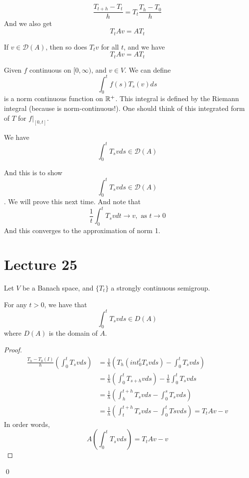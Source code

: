 \begin{equation*}
    \frac{T_{t+h}-T_t}{h}=T_t\frac{T_h-T_0}{h}
\end{equation*}
And we also get
\begin{equation*}
    T_tAv=AT_t
\end{equation*}
\begin{proposition}
    If $v\in\mathcal{D}(A)$, then so does $T_tv$ for all $t$, and we have
    \begin{equation*}
        T_tAv=AT_t
    \end{equation*}
\end{proposition}
Given $f$ continuous on $[0,\infty)$, and $v\in V$. We can define 
\begin{equation*}
    \int_0^tf(s)T_s(v)ds 
\end{equation*}
is a norm continuous function on $\mathbb{R}^+$. This integral is defined by the Riemann integral (because is norm-continuous!).
One should think of this integrated form of $T$ for $f\vert_{[0,t]}$.
\begin{proposition}
    We have
    \begin{equation*}
        \int_0^tT_svds\in\mathcal{D}(A)
    \end{equation*}
\end{proposition}
And this is to show 
\begin{equation*}
    \int_0^tT_svds\in\mathcal{D}(A)
\end{equation*}. We will prove this next time. And note that
\begin{equation*}
    \frac{1}{t}\int_0^tT_svdt\to v, \text{ as } t\to 0
\end{equation*}
And this converges to the approximation of norm 1.


\section{Lecture 25}
Let $V$ be a Banach space, and $\{T_t\}$ a strongly continuous semigroup.
\begin{proposition}
    For any $t>0$, we have that 
    \begin{equation*}
        \int_0^tT_svds\in{D}(A)
    \end{equation*}
    where $D(A)$ is the domain of $A$.
\end{proposition}

\begin{proof}
    \begin{align*}
        \frac{T_h-T_0(I)}{h}\left(\int_0^t T_svds\right)&=\frac{1}{h}\left( T_h\left(int_0^tT_svds\right)-\int_0^tT_svds\right)\\
        &=\frac{1}{h}\left(\int_0^tT_{s+h}vds\right)-\frac{1}{h}\int_0^tT_svds\\
        &=\frac{1}{h}\left(\int_h^{t+h}T_svds-\int_0^sT_svds\right)\\
        &=\frac{1}{h}\left(\int_t^{t+h}T_svds-\int_0^tTsvds\right)=T_tAv-v
    \end{align*}
    In order words, 
    \begin{equation*}
        A\left(\int_0^tT_svds\right)=T_tAv-v
    \end{equation*}
\end{proof}
\qed

